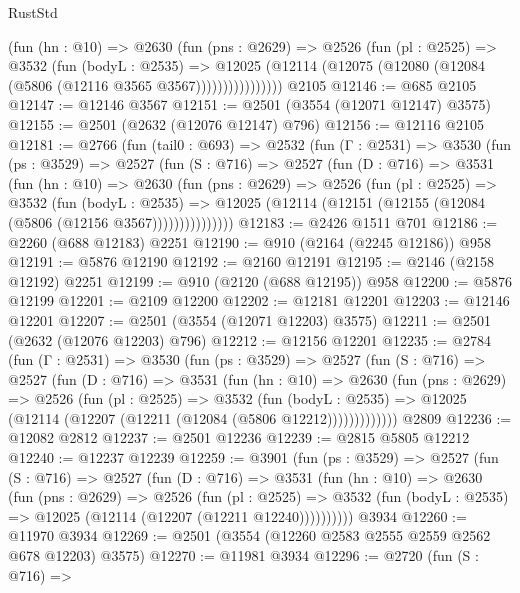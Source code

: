 \begin{lexlean}{RustStd}
\begin{coremodule}
{\begin{coremodule}
{{{{{{{{{{{{{{{{{{{{                (fun (hn : @10) =>
                @2630
                  (fun (pns : @2629) =>
                  @2526
                    (fun (pl : @2525) =>
                    @3532
                      (fun (bodyL : @2535) =>
                      @12025
                        (@12114 (@12075 (@12080 (@12084 (@5806 (@12116 @3565 @3567))))))))))))))))
    @2105
@12146 := @685 @2105
@12147 := @12146 @3567
@12151 := @2501 (@3554 (@12071 @12147) @3575)
@12155 := @2501 (@2632 (@12076 @12147) @796)
@12156 := @12116 @2105
@12181 := @2766
    (fun (tail0 : @693) =>
    @2532
      (fun (Γ : @2531) =>
      @3530
        (fun (ps : @3529) =>
        @2527
          (fun (S : @716) =>
          @2527
            (fun (D : @716) =>
            @3531
              (fun (hn : @10) =>
              @2630
                (fun (pns : @2629) =>
                @2526
                  (fun (pl : @2525) =>
                  @3532
                    (fun (bodyL : @2535) =>
                    @12025 (@12114 (@12151 (@12155 (@12084 (@5806 (@12156 @3567)))))))))))))))
@12183 := @2426 @1511 @701
@12186 := @2260 (@688 @12183) @2251
@12190 := @910 (@2164 (@2245 @12186)) @958
@12191 := @5876 @12190
@12192 := @2160 @12191
@12195 := @2146 (@2158 @12192) @2251
@12199 := @910 (@2120 (@688 @12195)) @958
@12200 := @5876 @12199
@12201 := @2109 @12200
@12202 := @12181 @12201
@12203 := @12146 @12201
@12207 := @2501 (@3554 (@12071 @12203) @3575)
@12211 := @2501 (@2632 (@12076 @12203) @796)
@12212 := @12156 @12201
@12235 := @2784
    (fun (Γ : @2531) =>
    @3530
      (fun (ps : @3529) =>
      @2527
        (fun (S : @716) =>
        @2527
          (fun (D : @716) =>
          @3531
            (fun (hn : @10) =>
            @2630
              (fun (pns : @2629) =>
              @2526
                (fun (pl : @2525) =>
                @3532
                  (fun (bodyL : @2535) =>
                  @12025 (@12114 (@12207 (@12211 (@12084 (@5806 @12212)))))))))))))
    @2809
@12236 := @12082 @2812
@12237 := @2501 @12236
@12239 := @2815 @5805 @12212
@12240 := @12237 @12239
@12259 := @3901
    (fun (ps : @3529) =>
    @2527
      (fun (S : @716) =>
      @2527
        (fun (D : @716) =>
        @3531
          (fun (hn : @10) =>
          @2630
            (fun (pns : @2629) =>
            @2526
              (fun (pl : @2525) =>
              @3532 (fun (bodyL : @2535) => @12025 (@12114 (@12207 (@12211 @12240))))))))))
    @3934
@12260 := @11970 @3934
@12269 := @2501 (@3554 (@12260 @2583 @2555 @2559 @2562 @678 @12203) @3575)
@12270 := @11981 @3934
@12296 := @2720
    (fun (S : @716) =>
}}}}}}}}}}}}}}}}}}}}
\end{coremodule}}
\end{coremodule}
\end{lexlean}
